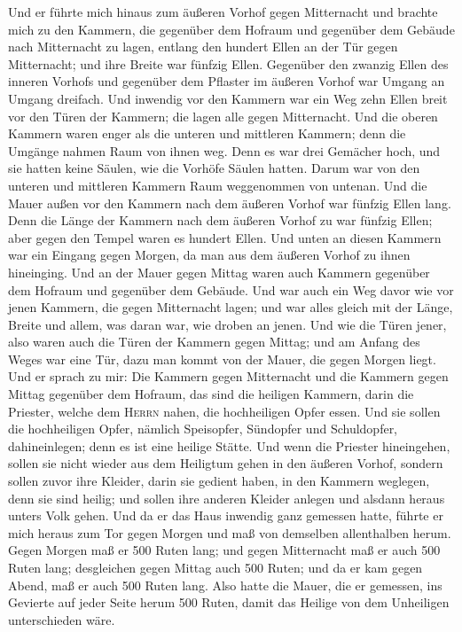  Und er führte mich hinaus zum äußeren Vorhof gegen
Mitternacht und brachte mich zu den Kammern, die gegenüber dem Hofraum
und gegenüber dem Gebäude nach Mitternacht zu lagen, 
entlang den hundert Ellen an der Tür gegen Mitternacht; und ihre Breite
war fünfzig Ellen.  Gegenüber den zwanzig Ellen des
inneren Vorhofs und gegenüber dem Pflaster im äußeren Vorhof war Umgang
an Umgang dreifach.  Und inwendig vor den Kammern war ein
Weg zehn Ellen breit vor den Türen der Kammern; die lagen alle gegen
Mitternacht.  Und die oberen Kammern waren enger als die
unteren und mittleren Kammern; denn die Umgänge nahmen Raum von ihnen
weg.  Denn es war drei Gemächer hoch, und sie hatten keine
Säulen, wie die Vorhöfe Säulen hatten. Darum war von den unteren und
mittleren Kammern Raum weggenommen von untenan.  Und die
Mauer außen vor den Kammern nach dem äußeren Vorhof war fünfzig Ellen
lang.  Denn die Länge der Kammern nach dem äußeren Vorhof
zu war fünfzig Ellen; aber gegen den Tempel waren es hundert Ellen.
 Und unten an diesen Kammern war ein Eingang gegen Morgen,
da man aus dem äußeren Vorhof zu ihnen hineinging.  Und
an der Mauer gegen Mittag waren auch Kammern gegenüber dem Hofraum und
gegenüber dem Gebäude.  Und war auch ein Weg davor wie
vor jenen Kammern, die gegen Mitternacht lagen; und war alles gleich mit
der Länge, Breite und allem, was daran war, wie droben an jenen.
 Und wie die Türen jener, also waren auch die Türen der
Kammern gegen Mittag; und am Anfang des Weges war eine Tür, dazu man
kommt von der Mauer, die gegen Morgen liegt.  Und er
sprach zu mir: Die Kammern gegen Mitternacht und die Kammern gegen
Mittag gegenüber dem Hofraum, das sind die heiligen Kammern, darin die
Priester, welche dem \textsc{Herrn} nahen, die hochheiligen Opfer essen.
Und sie sollen die hochheiligen Opfer, nämlich Speisopfer, Sündopfer und
Schuldopfer, dahineinlegen; denn es ist eine heilige Stätte.
 Und wenn die Priester hineingehen, sollen sie nicht
wieder aus dem Heiligtum gehen in den äußeren Vorhof, sondern sollen
zuvor ihre Kleider, darin sie gedient haben, in den Kammern weglegen,
denn sie sind heilig; und sollen ihre anderen Kleider anlegen und
alsdann heraus unters Volk gehen.  Und da er das Haus
inwendig ganz gemessen hatte, führte er mich heraus zum Tor gegen Morgen
und maß von demselben allenthalben herum.  Gegen Morgen
maß er 500 Ruten lang;  und gegen Mitternacht maß er auch
500 Ruten lang;  desgleichen gegen Mittag auch 500 Ruten;
 und da er kam gegen Abend, maß er auch 500 Ruten lang.
 Also hatte die Mauer, die er gemessen, ins Gevierte auf
jeder Seite herum 500 Ruten, damit das Heilige von dem Unheiligen
unterschieden wäre.

